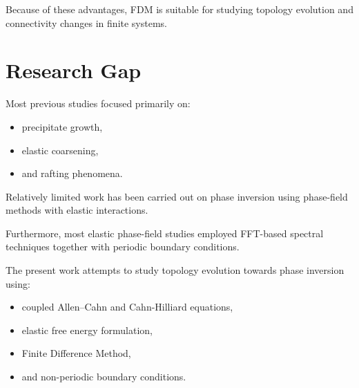 Because of these advantages, FDM is suitable for studying topology evolution and connectivity changes in finite systems.

\section{Research Gap}

Most previous studies focused primarily on:

\begin{itemize}
	\item precipitate growth,
	\item elastic coarsening,
	\item and rafting phenomena.
\end{itemize}

Relatively limited work has been carried out on phase inversion using phase-field methods with elastic interactions.

Furthermore, most elastic phase-field studies employed FFT-based spectral techniques together with periodic boundary conditions.

The present work attempts to study topology evolution towards phase inversion using:

\begin{itemize}
	\item coupled Allen--Cahn and Cahn-Hilliard equations,
	\item elastic free energy formulation,
	\item Finite Difference Method,
	\item and non-periodic boundary conditions.
\end{itemize}
